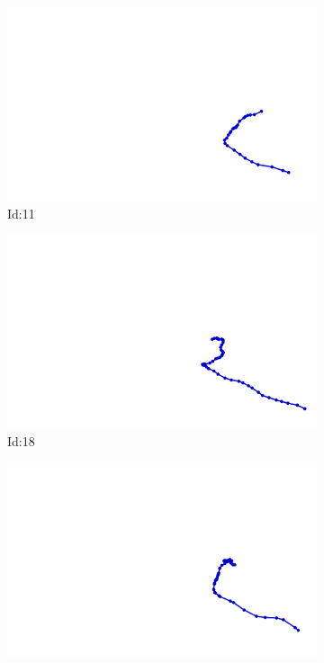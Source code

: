 \documentclass[12pt,twoside]{report}
\begin{document}
\begin{figure}
\centering
\begin{subfigure}[b]{0.20\textwidth}
\centering
\includegraphics[width=\textwidth]{../trajectories/11.png}
\caption{Id:11}
\end{subfigure}
\begin{subfigure}[b]{0.20\textwidth}
\centering
\includegraphics[width=\textwidth]{../trajectories/18.png}
\caption{Id:18}
\end{subfigure}
\begin{subfigure}[b]{0.20\textwidth}
\centering
\includegraphics[width=\textwidth]{../trajectories/39.png}

\end{subfigure}
\end{figure}
\end{document}
